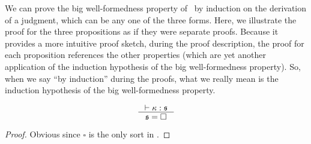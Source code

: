 We can prove the big well-formedness property of \Fi\ by induction on
the derivation of a judgment, which can be any one of the three forms.
Here, we illustrate the proof for the three propositions as if they were
separate proofs. Because it provides a more intuitive proof sketch, during 
the proof description, the proof for each proposition
references the other properties (which are yet another application of the
induction hypothesis of the big well-formedness property).
So, when we say ``by induction'' during the proofs, what we really mean is
the induction hypothesis of the big well-formedness property.

\begin{proposition}
\label{prop:wfsort}
\[ \inference{ |- \kappa : \mathfrak{s} }{ \mathfrak{s}=\square } \]
\end{proposition}
\begin{proof}Obvious since $\square$ is the only sort in \Fi.\end{proof}

